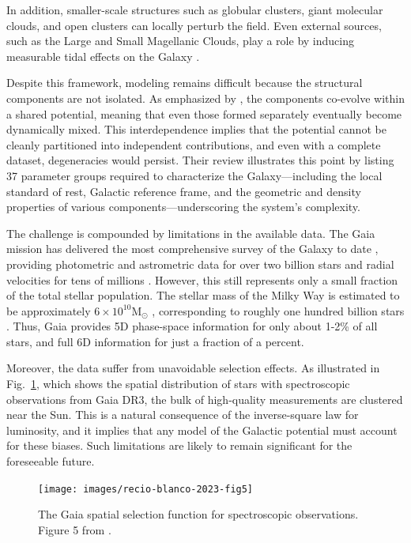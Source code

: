         In addition, smaller-scale structures such as globular clusters, giant molecular clouds, and open clusters can locally perturb the field. Even external sources, such as the Large and Small Magellanic Clouds, play a role by inducing measurable tidal effects on the Galaxy \citep{2022ApJ...939....2A}.

        Despite this framework, modeling remains difficult because the structural components are not isolated. As emphasized by \citet{2016ARA&A..54..529B}, the components co-evolve within a shared potential, meaning that even those formed separately eventually become dynamically mixed. This interdependence implies that the potential cannot be cleanly partitioned into independent contributions, and even with a complete dataset, degeneracies would persist. Their review illustrates this point by listing 37 parameter groups required to characterize the Galaxy—including the local standard of rest, Galactic reference frame, and the geometric and density properties of various components—underscoring the system's complexity.

        The challenge is compounded by limitations in the available data. The Gaia mission has delivered the most comprehensive survey of the Galaxy to date \citep{2023A&A...674A...1G}, providing photometric and astrometric data for over two billion stars and radial velocities for tens of millions \citep{2018A&A...616A..11G}. However, this still represents only a small fraction of the total stellar population. The stellar mass of the Milky Way is estimated to be approximately $6\times10^{10} \mathrm{M}_\odot$ \citep{2015ApJ...806...96L}, corresponding to roughly one hundred billion stars \citep[see also][]{2017MNRAS.465...76M}. Thus, Gaia provides 5D phase-space information for only about 1-2\% of all stars, and full 6D information for just a fraction of a percent.

        Moreover, the data suffer from unavoidable selection effects. As illustrated in Fig.~\ref{fig:gaia_selection_function}, which shows the spatial distribution of stars with spectroscopic observations from Gaia DR3, the bulk of high-quality measurements are clustered near the Sun. This is a natural consequence of the inverse-square law for luminosity, and it implies that any model of the Galactic potential must account for these biases. Such limitations are likely to remain significant for the foreseeable future.

        \begin{figure}
            \texttt{[image: images/recio-blanco-2023-fig5]}
            \caption{The Gaia spatial selection function for spectroscopic observations. Figure 5 from \citet{2023A&A...674A..38G}.}
            \label{fig:gaia_selection_function}
        \end{figure}

